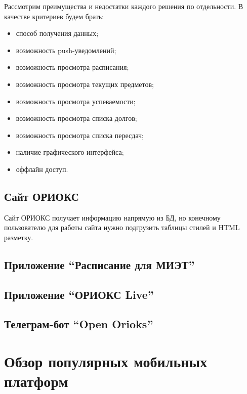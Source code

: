 Рассмотрим преимущества и недостатки каждого решения по отдельности.
В качестве критериев будем брать:
\begin{itemize}
  \item способ получения данных;
  \item возможность push-уведомлений;
  \item возможность просмотра расписания;
  \item возможность просмотра текущих предметов;
  \item возможность просмотра успеваемости;
  \item возможность просмотра списка долгов;
  \item возможность просмотра списка пересдач;
  \item наличие графического интерфейса;
  \item оффлайн доступ.
\end{itemize}

\subsection{Сайт ОРИОКС}
\label{subsec:orioks}

Сайт ОРИОКС получает информацию напрямую из БД, но конечному пользователю для работы сайта нужно подгрузить таблицы стилей и HTML разметку.


\subsection{Приложение ``Расписание для МИЭТ''}
\label{subsec:appMietSchedule}

\subsection{Приложение ``ОРИОКС Live''}
\label{subsec:appOrioksLive}

\subsection{Телеграм-бот ``Open Orioks''}
\label{subsec:botOpenOrioks}

\section{Обзор популярных мобильных платформ}
\label{sec:platforms}

